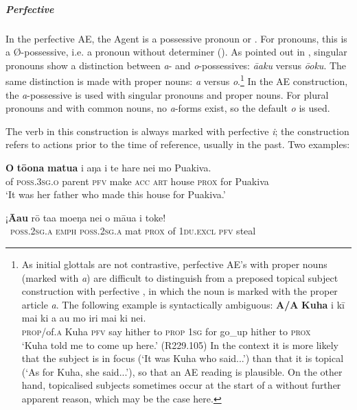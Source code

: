 \subparagraph{Perfective} In the perfective AE, the Agent is a possessive pronoun or . For pronouns, this is a Ø-possessive, i.e. a pronoun without determiner (). As pointed out in , singular pronouns show a distinction between \textit{a}{}- and \textit{o}{}-possessives: \textit{{\ꞌ}ā{\ꞌ}aku} versus \textit{ō{\ꞌ}oku}. The same distinction is made with proper nouns:  \textit{{\ꞌ}a} versus \textit{o}.\footnote{\label{fn:430}As initial glottals are not contrastive, perfective AE’s with proper nouns (marked with \textit{{\ꞌ}a}) are difficult to distinguish from a preposed topical subject construction with perfective , in which the noun is marked with the proper article \textit{a}. The following example is syntactically ambiguous:
\ea
\gll
\textbf{A/{\ꞌ}A} \textbf{Kuha} i kī mai ki a au mo iri mai ki nei.\\
  \textsc{prop}/of\textsc{.a} Kuha \textsc{pfv} say hither to \textsc{prop} \textsc{1sg} for go\_up hither to \textsc{prox}\\
  \glt 
  ‘Kuha told me to come up here.’ (R229.105)
  \z
In the context it is more likely that the subject is in focus (‘It was Kuha who said...’) than that it is topical (‘As for Kuha, she said...’), so that an AE reading is plausible. On the other hand, topicalised subjects sometimes occur at the start of a  without further apparent reason, which may be the case here.} In the AE construction, the \textit{a}{}-possessive is used with singular pronouns and proper nouns. For plural pronouns and with common nouns, no \textit{a}\nobreakdash-forms exist, so the default \textit{o} is used.

The verb in this construction is always marked with perfective \textit{i}; the construction refers to actions prior to the time of reference, usually in the past. Two examples:

\ea\label{ex:8.96}
\gll \textbf{O} \textbf{tō{\ꞌ}ona} \textbf{matu{\ꞌ}a} i aŋa i te hare nei mo Puakiva. \\
of \textsc{poss.3sg.o} parent \textsc{pfv} make \textsc{acc} \textsc{art} house \textsc{prox} for Puakiva \\

\glt 
‘It was her father who made this house for Puakiva.’ \textstyleExampleref{[R229.269]} 
\z

\ea\label{ex:8.97}
\gll ¡\textbf{{\ꞌ}Ā{\ꞌ}au} rō ta{\ꞌ}a moeŋa nei o māua i toke! \\
~\textsc{poss.2sg.a} \textsc{emph} \textsc{poss.2sg.a} mat \textsc{prox} of \textsc{1du.excl} \textsc{pfv} steal \\

